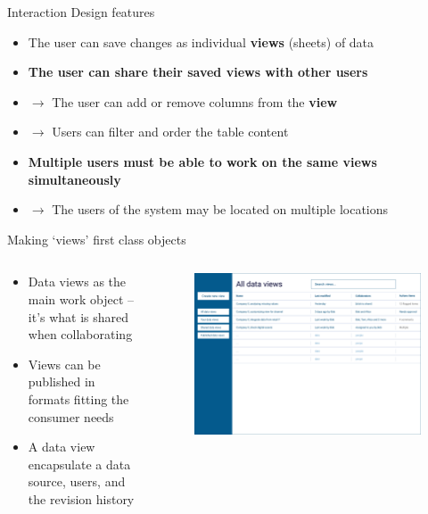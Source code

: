 \documentclass[aspectratio=169]{beamer}
\begin{document}
\begin{frame}{Interaction Design features}
    \begin{itemize}
        \item The user can save changes as individual \textbf{views} (sheets) of data
        \item \textbf{The user can share their saved views with other users}
        \item[] $\rightarrow$ The user can add or remove columns from the \textbf{view}
        \item[] $\rightarrow$ Users can filter and order the table content
        \item \textbf{Multiple users must be able to work on the same views simultaneously}
        \item[] $\rightarrow$ The users of the system may be located on multiple locations
    \end{itemize} 
\end{frame}


\begin{frame}{Making `views' first class objects}
    \begin{columns}
        \begin{column}{0.4\textwidth}
            \begin{itemize}
                \footnotesize
                \item Data views as the main work object -- it's what is shared when collaborating
                \item Views can be published in formats fitting the consumer needs
                \item A data view encapsulate a data source, users, and the revision history
            \end{itemize}
        \end{column}
        \begin{column}{0.6\textwidth}
            \begin{figure}[h]
                \centering
                \includegraphics[width=1\textwidth]{images/all-data-view.png}
            \end{figure}
        \end{column}
    \end{columns}
\end{frame}
\end{document}
